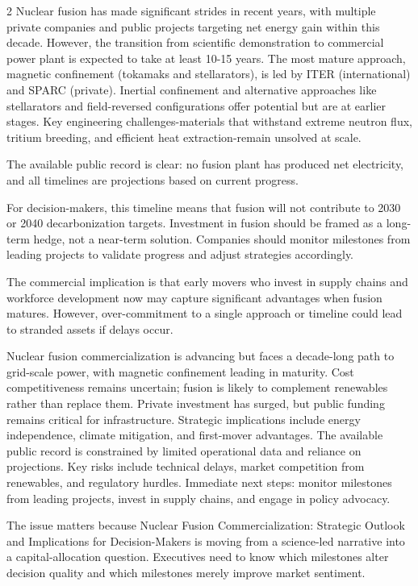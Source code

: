 \documentclass[10pt,a4paper]{article}
\begin{document}
\begin{multicols}{2}
{\small Nuclear fusion has made significant strides in recent years, with multiple private companies and public projects targeting net energy gain within this decade. However, the transition from scientific demonstration to commercial power plant is expected to take at least 10-15 years. The most mature approach, magnetic confinement (tokamaks and stellarators), is led by ITER (international) and SPARC (private). Inertial confinement and alternative approaches like stellarators and field-reversed configurations offer potential but are at earlier stages. Key engineering challenges-materials that withstand extreme neutron flux, tritium breeding, and efficient heat extraction-remain unsolved at scale.}\par
{\small The available public record is clear: no fusion plant has produced net electricity, and all timelines are projections based on current progress.}\par
{\small For decision-makers, this timeline means that fusion will not contribute to 2030 or 2040 decarbonization targets. Investment in fusion should be framed as a long-term hedge, not a near-term solution. Companies should monitor milestones from leading projects to validate progress and adjust strategies accordingly.}\par
{\small The commercial implication is that early movers who invest in supply chains and workforce development now may capture significant advantages when fusion matures. However, over-commitment to a single approach or timeline could lead to stranded assets if delays occur.}\par
{\small Nuclear fusion commercialization is advancing but faces a decade-long path to grid-scale power, with magnetic confinement leading in maturity. Cost competitiveness remains uncertain; fusion is likely to complement renewables rather than replace them. Private investment has surged, but public funding remains critical for infrastructure. Strategic implications include energy independence, climate mitigation, and first-mover advantages. The available public record is constrained by limited operational data and reliance on projections. Key risks include technical delays, market competition from renewables, and regulatory hurdles. Immediate next steps: monitor milestones from leading projects, invest in supply chains, and engage in policy advocacy.}\par
{\small The issue matters because Nuclear Fusion Commercialization: Strategic Outlook and Implications for Decision-Makers is moving from a science-led narrative into a capital-allocation question. Executives need to know which milestones alter decision quality and which milestones merely improve market sentiment.}\par

\end{multicols}
\end{document}
